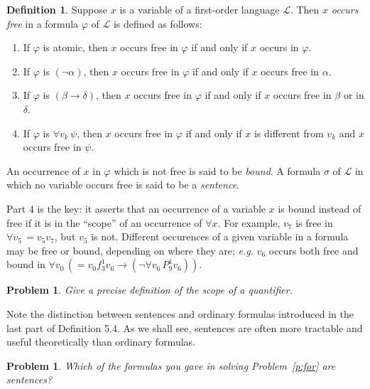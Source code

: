 \documentclass[12pt]{amsbook}
\theoremstyle{plain}
\newtheorem{prob}[thm]{Problem}
\theoremstyle{definition}
\newtheorem{defn}{Definition}[chapter]
\theoremstyle{remark}
\begin{document}
\begin{defn} \label{d:frv}    
Suppose $x$ is a variable of a first-order language $\mathcal{L}$.  Then $x$ {\em occurs free\/} in a formula $\varphi$ of $\mathcal{L}$ is defined as follows:
\begin{enumerate}
\item If $\varphi$ is atomic,  then $x$ occurs free in $\varphi$ if and only if $x$ occurs in $\varphi$.
\item If $\varphi$ is $(\lnot \alpha)$,  then $x$ occurs free in $\varphi$ if and only if $x$ occurs free in $\alpha$.
\item If $\varphi$ is $(\beta \to \delta)$,  then $x$ occurs free in $\varphi$ if and only if $x$ occurs free in $\beta$ or in $\delta$.
\item If $\varphi$ is $\forall v_k \, \psi$,  then $x$ occurs free in $\varphi$ if and only if $x$ is different from $v_k$ and $x$ occurs free in $\psi$.
\end{enumerate}
An occurrence of $x$ in $\varphi$ which is not free is said to be {\em bound\/}.  A formula $\sigma$ of $\mathcal{L}$ in which no variable occurs free is said to be a {\em sentence\/}.
\end{defn}

Part 4 is the key:  it asserts that an occurrence of a variable $x$ is bound instead of free if it is in the ``scope'' of an occurrence of $\forall x$.  For example,  $v_7$ is free in $\forall v_5 \, = v_5 v_7$,  but $v_5$ is not.  Different occurences of a given variable in a formula may be free or bound,  depending on where they are;  {\em e.g.\/} $v_6$ occurs both free and bound in $\forall v_0 \, (= v_0 f^1_3 v_6 \to (\lnot \forall v_6 \, P^1_9 v_6))$.

\begin{prob}  \label{p:five11}  
Give a precise definition of the scope of a quantifier.
\end{prob}

Note the distinction between sentences and ordinary formulas introduced in the last part of Definition 5.4.  As we shall see,  sentences are often more tractable and useful theoretically than ordinary formulas.

\begin{prob} \label{p:five12}
Which of the formulas you gave in solving Problem~\ref{p:for} are sentences?
\end{prob}
\end{document}
